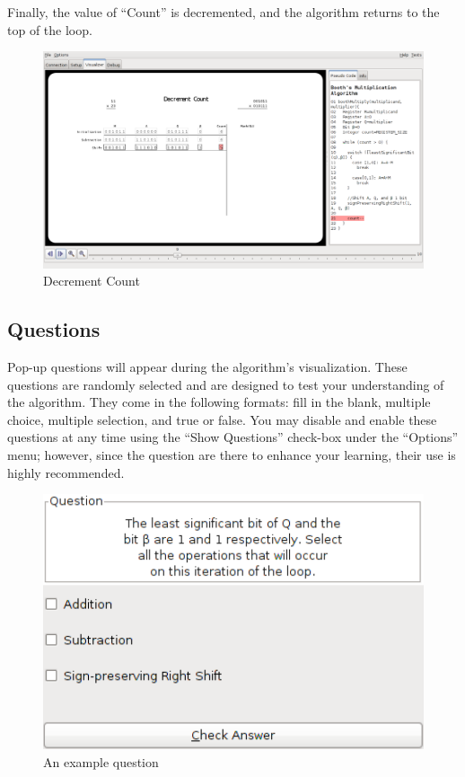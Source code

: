 \documentclass{article}
\begin{document}
\pagebreak
Finally, the value of ``Count'' is decremented, and the algorithm returns to the top of the loop.

\begin{figure}[h]
\centering
\includegraphics[scale=0.3]{dec.pdf}
\caption{Decrement Count}
\end{figure}

\pagebreak

\subsection{Questions}

Pop-up questions will appear during the algorithm's visualization.
These questions are randomly selected and are designed to test your understanding of the algorithm.
They come in the following formats: fill in the blank, multiple choice, multiple selection, and true or false.
You may disable and enable these questions at any time using the ``Show Questions'' check-box under the ``Options'' menu; however, since the question are there to enhance your learning, their use is highly recommended.

\begin{figure}[h]
\centering
\includegraphics[scale=0.5]{que.pdf}
\caption{An example question}
\end{figure}
\end{document}
